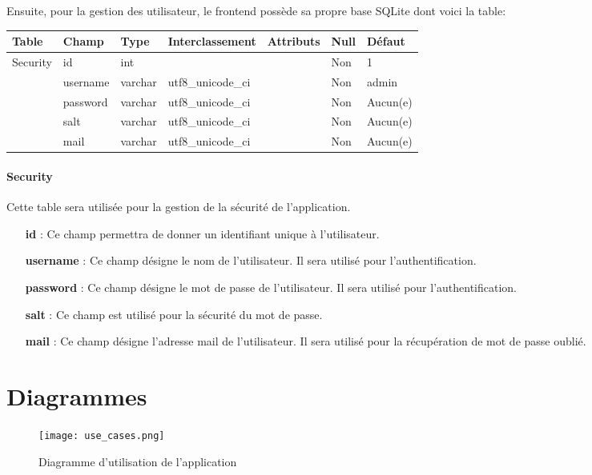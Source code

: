 Ensuite, pour la gestion des utilisateur, le frontend possède sa propre base SQLite dont voici la table:

\vspace{2em}

\begin{tabular}{|l|l|l|l|l|l|l|}
   \hline
    Table & Champ & Type & Interclassement & Attributs & Null & Défaut \\
    \hline
        Security & id & int &  &  & Non & 1 \\
    \cline{2-7}
         & username & varchar & utf8\_unicode\_ci & & Non & admin \\
    \cline{2-7}
         & password & varchar & utf8\_unicode\_ci & & Non & Aucun(e) \\
    \cline{2-7}
         & salt & varchar & utf8\_unicode\_ci & & Non & Aucun(e) \\
    \cline{2-7}
         & mail & varchar & utf8\_unicode\_ci & & Non & Aucun(e) \\
    \hline
\end{tabular}

\paragraph{Security} Cette table sera utilisée pour la gestion de la sécurité de l'application.
\begin{itemize}
    \item [\textbf{id}] : Ce champ permettra de donner un identifiant unique à l'utilisateur.
    \item [\textbf{username}] : Ce champ désigne le nom de l'utilisateur. Il sera utilisé pour l'authentification.
    \item [\textbf{password}] : Ce champ désigne le mot de passe de l'utilisateur. Il sera utilisé pour l'authentification.
    \item [\textbf{salt}] : Ce champ est utilisé pour la sécurité du mot de passe.
    \item [\textbf{mail}] : Ce champ désigne l'adresse mail de l'utilisateur. Il sera utilisé pour la récupération de mot de passe oublié.
\end{itemize}

\section{Diagrammes}

\begin{figure}[H]
    \texttt{[image: use\_cases.png]}
    \caption{Diagramme d'utilisation de l'application}
    \label{fig:use_cases}
\end{figure}


